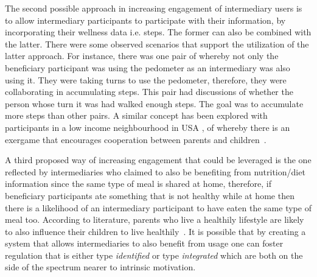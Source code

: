 The second possible approach in increasing engagement of intermediary users is to allow intermediary participants to participate with their information, by incorporating their wellness data i.e. steps. The former can also be combined with the latter. There were some observed scenarios that support the utilization of the latter approach. For instance, there was one pair of whereby not only the beneficiary participant was using the pedometer as an intermediary was also using it. They were taking turns to use the pedometer, therefore, they were collaborating in accumulating steps. This pair had discussions of whether the person whose turn it was had walked enough steps. The goal was to accumulate more steps than other pairs. A similar concept has been explored with participants in a low income neighbourhood in USA , of whereby there is an exergame that encourages cooperation between parents and children~\citep{saksono2015spaceship}.

A third proposed way of increasing engagement that could be leveraged is the one reflected by intermediaries who claimed to also be benefiting from nutrition/diet information since the same type of meal is shared at home, therefore, if beneficiary participants ate something that is not healthy while at home then there is a likelihood of an intermediary participant to have eaten the same type of meal too. According to literature, parents who live a healthily lifestyle are likely to also influence their children to live healthily~\citep{grimes2009toward}. It is possible that by creating a system that allows intermediaries to also benefit from usage one can foster regulation that is either type \emph{identified} or type \emph{integrated} which are both on the side of the spectrum nearer to intrinsic motivation. 

